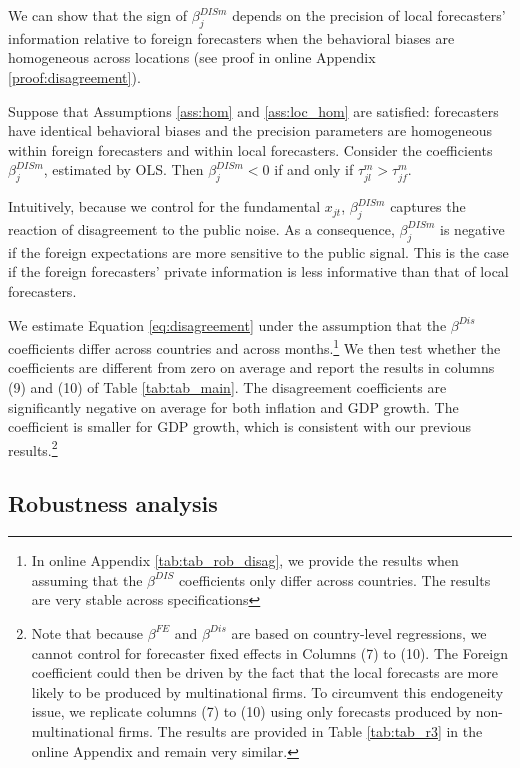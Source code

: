 We can show that the sign of $\beta^{DISm}_{j}$ depends on the precision of local forecasters' information relative to foreign forecasters when the behavioral biases are homogeneous across locations (see proof in online Appendix \ref{proof:disagreement}).
\begin{prop}\label{prop:disagreement} Suppose that Assumptions \ref{ass:hom} and \ref{ass:loc_hom} are satisfied: forecasters have identical behavioral biases and the precision parameters are homogeneous within foreign forecasters and within local forecasters. Consider the coefficients $\beta^{DISm}_{j}$, estimated by OLS. Then $\beta^{DISm}_{j}<0$ if and only if $\tau_{jl}^m>\tau_{jf}^m$.
\end{prop}
Intuitively, because we control for the fundamental $x_{jt}$, $\beta^{DISm}_{j}$ captures the reaction of disagreement to the public noise. As a consequence, $\beta^{DISm}_{j}$ is negative if the foreign expectations are more sensitive to the public signal. This is the case if the foreign forecasters' private information is less informative than that of local forecasters.

We estimate Equation \eqref{eq:disagreement} under the assumption that the $\beta^{Dis}$ coefficients differ across countries and across months.\footnote{In online Appendix \ref{tab:tab_rob_disag}, we provide the results when assuming that the $\beta^{DIS}$ coefficients only differ across countries. The results are very stable across specifications} We then test whether the coefficients are different from zero on average and report the results in columns (9) and (10) of Table \ref{tab:tab_main}. The disagreement coefficients are significantly negative on average for both inflation and GDP growth. The coefficient is smaller for GDP growth, which is consistent with our previous results.\footnote{Note that because $\beta^{FE}$ and $\beta^{Dis}$ are based on country-level regressions, we cannot control for forecaster fixed effects in Columns (7) to (10). The Foreign coefficient could then be driven by the fact that the local forecasts are more likely to be produced by multinational firms. To circumvent this endogeneity issue, we replicate columns (7) to (10) using only forecasts produced by non-multinational firms. The results are provided in Table \ref{tab:tab_r3} in the online Appendix and remain very similar.}

\subsection{Robustness analysis}

